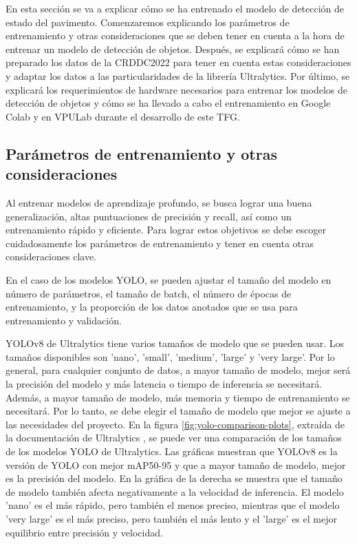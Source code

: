 En esta sección se va a explicar cómo se ha entrenado el modelo de detección de estado del pavimento. Comenzaremos explicando los parámetros de entrenamiento y otras consideraciones que se deben tener en cuenta a la hora de entrenar un modelo de detección de objetos. Después, se explicará cómo se han preparado los datos de la CRDDC2022 para tener en cuenta estas consideraciones y adaptar los datos a las particularidades de la librería Ultralytics. Por último, se explicará los requerimientos de hardware necesarios para entrenar los modelos de detección de objetos y cómo se ha llevado a cabo el entrenamiento en Google Colab y en VPULab durante el desarrollo de este TFG.

\subsection{Parámetros de entrenamiento y otras consideraciones}
Al entrenar modelos de aprendizaje profundo, se busca lograr una buena generalización, altas puntuaciones de precisión y recall, así como un entrenamiento rápido y eficiente. Para lograr estos objetivos se debe escoger cuidadosamente los parámetros de entrenamiento y tener en cuenta otras consideraciones clave.

En el caso de los modelos YOLO, se pueden ajustar el tamaño del modelo en número de parámetros, el tamaño de batch, el número de épocas de entrenamiento, y la proporción de los datos anotados que se usa para entrenamiento y validación.

YOLOv8 de Ultralytics tiene varios tamaños de modelo que se pueden usar. Los tamaños disponibles son 'nano', 'small', 'medium', 'large' y 'very large'. Por lo general, para cualquier conjunto de datos, a mayor tamaño de modelo, mejor será la precisión del modelo y más latencia o tiempo de inferencia se necesitará. Además, a mayor tamaño de modelo, más memoria y tiempo de entrenamiento se necesitará. Por lo tanto, se debe elegir el tamaño de modelo que mejor se ajuste a las necesidades del proyecto. En la figura \ref{fig:yolo-comparison-plots}, extraída de la documentación de Ultralytics \cite{yolov8_ultralytics}, se puede ver una comparación de los tamaños de los modelos YOLO de Ultralytics. Las gráficas muestran que YOLOv8 es la versión de YOLO con mejor mAP50-95 y que a mayor tamaño de modelo, mejor es la precisión del modelo. En la gráfica de la derecha se muestra que el tamaño de modelo también afecta negativamente a la velocidad de inferencia. El modelo 'nano' es el más rápido, pero también el menos preciso, mientras que el modelo 'very large' es el más preciso, pero también el más lento y el 'large' es el mejor equilibrio entre precisión y velocidad.

